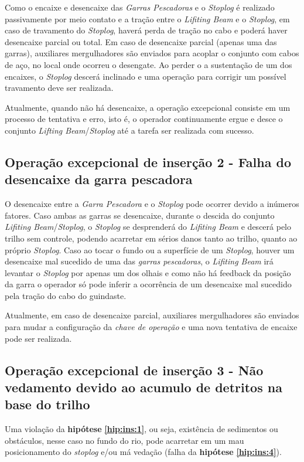Como o encaixe e desencaixe das \emph{Garras Pescadoras} e o \emph{Stoplog} é
realizado passivamente por meio contato e a tração entre o \emph{Lifiting Beam}
e o \emph{Stoplog}, em caso de travamento do \emph{Stoplog}, haverá perda de tração no cabo e poderá haver
desencaixe parcial ou total. Em caso de desencaixe parcial (apenas uma das
garras), auxiliares mergulhadores são enviados para acoplar o conjunto com cabos
de aço, no local onde ocorreu o desengate. Ao perder o a sustentação de um dos
encaixes, o \emph{Stoplog} descerá inclinado e uma operação para corrigir um
possível travamento deve ser realizada.

Atualmente, quando não há desencaixe, a operação excepcional consiste em um
processo de tentativa e erro, isto é, o operador continuamente ergue e desce o
conjunto \emph{Lifting Beam}/\emph{Stoplog} até a tarefa ser realizada com
sucesso.


\subsection{Operação excepcional de inserção 2 - Falha do desencaixe da garra pescadora}
\label{op:ins:2}

O desencaixe entre a \emph{Garra Pescadora} e o \emph{Stoplog} pode ocorrer
devido a inúmeros fatores. Caso ambas as garras se desencaixe, durante o descida do conjunto \emph{Lifiting Beam}/\emph{Stoplog}, o \emph{Stoplog} se desprenderá do
\emph{Lifiting Beam} e descerá pelo trilho sem controle, podendo acarretar em
sérios danos tanto ao trilho, quanto ao próprio \emph{Stoplog}. Caso ao tocar o fundo ou a superfície de um \emph{Stoplog}, houver um desencaixe mal sucedido de uma das \emph{garras pescadoras}, o \emph{Lifiting Beam} irá levantar o \emph{Stoplog} por apenas um dos olhais e como não há feedback da posição da garra o operador só pode inferir a ocorrência de um desencaixe mal sucedido pela tração do cabo do guindaste. 

Atualmente, em caso de desencaixe
parcial, auxiliares mergulhadores são enviados para mudar a configuração da
\emph{chave de operação} e uma nova tentativa de encaixe pode ser realizada. 

\subsection{Operação excepcional de inserção 3 - Não vedamento devido ao acumulo de detritos na base do trilho}

Uma violação da \textbf{hipótese} \textbf{\ref{hip:ins:1}}, ou seja, existência
de sedimentos ou obstáculos, nesse caso no fundo do rio, pode acarretar em um mau posicionamento do
\emph{stoplog} e/ou má vedação (falha da \textbf{hipótese} \textbf{\ref{hip:ins:4}}).

